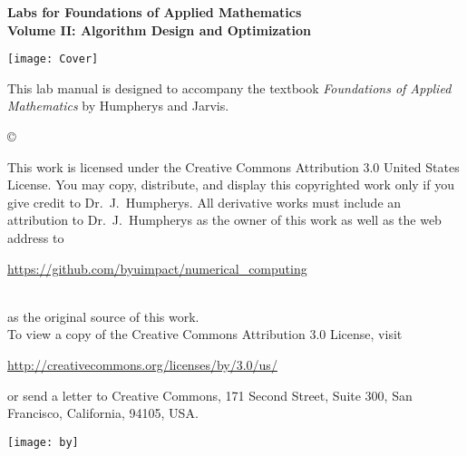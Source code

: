 \documentclass[nociteref]{SIAM-GH-book}
\begin{document}

\thispagestyle{empty}

\begin{center}
{\huge \bf Labs for Foundations of Applied Mathematics} \\
\vspace{5mm}
{\Large \bf Volume II: Algorithm
Design and Optimization}
\vspace{20mm}

\texttt{[image: Cover]}
\end{center}
\frontmatter




\begin{thepreface}
This lab manual is designed to accompany the textbook \emph{Foundations of Applied Mathematics} by Humpherys and Jarvis.

\vfill
\copyright{This work is licensed under the Creative Commons Attribution 3.0 United States
License.  You may copy, distribute, and display this copyrighted work only if you give
credit to Dr.~J.~Humpherys. All derivative works must include an attribution to Dr.~J.~Humpherys as the owner of this work as well as the web address to
\\\centerline{\url{https://github.com/byuimpact/numerical_computing}}\\ as the original source of
this
work.\\To view a copy of the Creative Commons Attribution 3.0 License,
visit\\\centerline{\url{http://creativecommons.org/licenses/by/3.0/us/}} or send a letter to
Creative Commons, 171 Second Street, Suite 300, San Francisco, California, 94105, USA.}

\vfill
\centering\texttt{[image: by]}
\vfill
\end{thepreface}

\setcounter{tocdepth}{1}
\tableofcontents

\mainmatter


\end{document}
